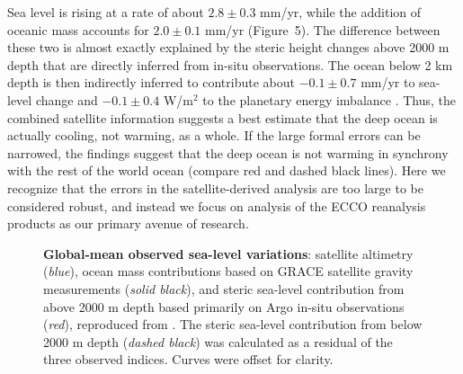 \documentclass[authoryear,round,12pt]{article}
\begin{document}
Sea level is rising at a rate of about $2.8\pm 0.3$ mm/yr, while the
addition of oceanic mass accounts for $2.0\pm 0.1$ mm/yr
(Figure~5). The difference between these two is almost exactly
explained by the steric height changes above 2000 m depth that are
directly inferred from in-situ observations. The ocean below 2 km
depth is then indirectly inferred to contribute about $-0.1 \pm 0.7$
mm/yr to sea-level change and $-0.1 \pm 0.4$ W/m$^2$ to the planetary
energy imbalance \citep{Llovel-Willis-2014:Deep}. Thus, the combined
satellite information suggests a best estimate that the deep ocean is
actually cooling, not warming, as a whole. If the large formal errors
can be narrowed, the findings suggest that the deep ocean is not
warming in synchrony with the rest of the world ocean (compare red and
dashed black lines). Here we recognize that the errors in the
satellite-derived analysis are too large to be considered robust, and
instead we focus on analysis of the ECCO reanalysis products as our
primary avenue of research.


\begin{figure}[htbp]
\begin{center}
  \caption{{\bf Global-mean observed sea-level variations}: satellite altimetry ({\it blue}), ocean mass contributions based on GRACE satellite gravity measurements ({\it solid black}), and steric sea-level contribution from above 2000 m depth based primarily on Argo in-situ observations ({\it red}), reproduced from \citet{Llovel-Willis-2014:Deep}. The steric sea-level contribution from below 2000 m depth ({\it dashed black}) was calculated as a residual of the three observed indices. Curves were offset for clarity.}
\end{center}
  \label{fig:llovel}
\end{figure}



\end{document}
